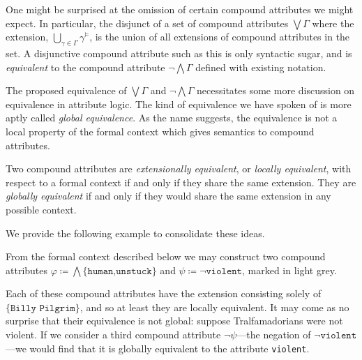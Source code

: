 One might be surprised at the omission of certain compound attributes we might expect. In particular, the disjunct of a
set of compound attributes $\bigvee \Gamma$ where the extension, $\bigcup_{\gamma \in \Gamma}\gamma^{\vDash}$, is the
union of all extensions of compound attributes in the set. A disjunctive compound attribute such as this is only syntactic
sugar, and is \textit{equivalent} to the compound attribute $\neg \bigwedge \Gamma$ defined with existing notation.

The proposed equivalence of $\bigvee \Gamma$ and $\neg \bigwedge \Gamma$ necessitates some more discussion on equivalence
in attribute logic. The kind of equivalence we have spoken of is more aptly called \textit{global equivalence}. As the
name suggests, the equivalence is not a local property of the formal context which gives semantics to compound attributes.

\begin{definition}
	\label{definition:equivalence-compound-attributes}

	Two compound attributes are \textit{extensionally equivalent}, or \textit{locally equivalent}, with respect to a
	formal context if and only if they share the same extension. They are \textit{globally equivalent} if and only if they
	would share the same extension in any possible context.
\end{definition}

We provide the following example to consolidate these ideas.

\begin{example}
	From the formal context described below we may construct two compound attributes $\varphi \coloneqq \bigwedge \{\texttt
	{human,unstuck}\}$ and $\psi \coloneqq \neg \texttt{violent}$, marked in light grey.
	\begin{figure}[H]
		\centering
		\small
		\begin{cxt}
			\label{cxt:slaughterhouse5}   
			   \atr{\textcolor{gray!70}{$\varphi$}}\atr{\textcolor{gray!70}{$\psi$}}

			   
		\end{cxt}
	\end{figure}
	Each of these compound attributes have the extension consisting solely of $\{\texttt{Billy Pilgrim}\}$, and so at
	least they are locally equivalent. It may come as no surprise that their equivalence is not global: suppose
	Tralfamadorians were not violent. If we consider a third compound attribute $\neg \psi$---the negation of $\neg \texttt
	{violent}$---we would find that it is globally equivalent to the attribute \texttt{violent}.
\end{example}
\clearpage

